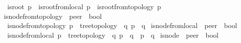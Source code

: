 \begin{isabellebody}
\ \ {\isachardoublequoteopen}is{\isacharunderscore}{\kern0pt}root\ p\ {\isasymequiv}\ is{\isacharunderscore}{\kern0pt}root{\isacharunderscore}{\kern0pt}from{\isacharunderscore}{\kern0pt}local\ p\ {\isasymor}\ is{\isacharunderscore}{\kern0pt}root{\isacharunderscore}{\kern0pt}from{\isacharunderscore}{\kern0pt}topology\ p{\isachardoublequoteclose}\isanewline
\ \ \isanewline
\isanewline
{}\isamarkupfalse%
\ is{\isacharunderscore}{\kern0pt}node{\isacharunderscore}{\kern0pt}from{\isacharunderscore}{\kern0pt}topology\ {\isacharcolon}{\kern0pt}{\isacharcolon}{\kern0pt}\ {\isachardoublequoteopen}{\isacharprime}{\kern0pt}peer\ {\isasymRightarrow}\ bool{\isachardoublequoteclose}\ \isanewline
\ \ {\isachardoublequoteopen}is{\isacharunderscore}{\kern0pt}node{\isacharunderscore}{\kern0pt}from{\isacharunderscore}{\kern0pt}topology\ p\ {\isasymequiv}\ {\isacharparenleft}{\kern0pt}tree{\isacharunderscore}{\kern0pt}topology\ {\isasymand}\ {\isacharparenleft}{\kern0pt}{\isasymexists}q{\isachardot}{\kern0pt}\ {\isasymG}{\isasymlangle}{\isasymrightarrow}p{\isasymrangle}\ {\isacharequal}{\kern0pt}\ {\isacharbraceleft}{\kern0pt}q{\isacharbraceright}{\kern0pt}{\isacharparenright}{\kern0pt}{\isacharparenright}{\kern0pt}{\isachardoublequoteclose}\isanewline
\isanewline
{}\isamarkupfalse%
\ is{\isacharunderscore}{\kern0pt}node{\isacharunderscore}{\kern0pt}from{\isacharunderscore}{\kern0pt}local\ {\isacharcolon}{\kern0pt}{\isacharcolon}{\kern0pt}\ {\isachardoublequoteopen}{\isacharprime}{\kern0pt}peer\ {\isasymRightarrow}\ bool{\isachardoublequoteclose}\ \ \isanewline
\ \ {\isachardoublequoteopen}is{\isacharunderscore}{\kern0pt}node{\isacharunderscore}{\kern0pt}from{\isacharunderscore}{\kern0pt}local\ p\ {\isasymequiv}\ tree{\isacharunderscore}{\kern0pt}topology\ {\isasymand}\ {\isacharparenleft}{\kern0pt}{\isasymexists}q{\isachardot}{\kern0pt}\ {\isasymP}\isactrlsub {\isacharquery}{\kern0pt}{\isacharparenleft}{\kern0pt}p{\isacharparenright}{\kern0pt}\ {\isacharequal}{\kern0pt}\ {\isacharbraceleft}{\kern0pt}q{\isacharbraceright}{\kern0pt}\ {\isasymor}\ p\ {\isasymin}\ {\isasymP}\isactrlsub {\isacharbang}{\kern0pt}{\isacharparenleft}{\kern0pt}q{\isacharparenright}{\kern0pt}{\isacharparenright}{\kern0pt}{\isachardoublequoteclose}\isanewline
\isanewline
{}\isamarkupfalse%
\ is{\isacharunderscore}{\kern0pt}node\ {\isacharcolon}{\kern0pt}{\isacharcolon}{\kern0pt}\ {\isachardoublequoteopen}{\isacharprime}{\kern0pt}peer\ {\isasymRightarrow}\ bool{\isachardoublequoteclose}\ \ \isanewline

\end{isabellebody}
